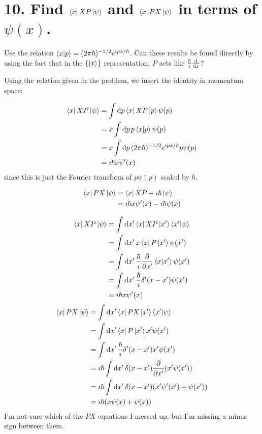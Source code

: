 \documentclass[a4paper,twoside]{article}
\begin{document}
\section*{10. Find $ \bra{x} XP \ket{\psi} $ and $ \bra{x} PX \ket{\psi} $ in terms of $ \psi(x) $.}
Use the relation $ \bra{x}\ket{p} = (2 \pi \hbar)^{-1/2} e^{\imath p x/ \hbar} $. Can these results be found directly by using the fact that in the $ \{\ket{x}\} $ representation, $ P $ acts like $ \frac{\hbar}{\imath} \dv{x} $?
\begin{problem}
    Using the relation given in the problem, we insert the identity in momentum space:

    \begin{align}
        \bra{x} XP \ket{\psi} &= \int \dd{p} \bra{x} XP \ket{p} \psi(p)\\
        &= x\int \dd{p} p \bra{x}\ket{p} \psi(p)\\
        &= x \int \dd{p} (2 \pi \hbar)^{-1/2} e^{\imath px/\hbar} p \psi(p)\\
        &= \imath\hbar x \psi'(x)
    \end{align}
    since this is just the Fourier transform of $ p \psi(p) $ scaled by $ \hbar $.

    \begin{align}
        \bra{x} PX \ket{\psi} &= \bra{x} XP - \imath\hbar\ket{\psi}\\
        &= \imath\hbar x\psi'(x) - \imath\hbar\psi(x)
    \end{align}
    
    \begin{align}
        \bra{x} XP \ket{\psi} &= \int \dd{x'} \bra{x} XP \ket{x'}\bra{x'}\ket{\psi}\\
        &= \int \dd{x'} x \bra{x} P \ket{x'} \psi(x')\\
        &= \int \dd{x'} \frac{\hbar}{\imath} \pdv{x'} \bra{x}\ket{x'} \psi(x')\\
        &= \int \dd{x'} \frac{\hbar}{\imath} \delta'(x-x') \psi(x')\\
        &= \imath\hbar x \psi'(x)
    \end{align}
    \begin{align}
        \bra{x} PX \ket{\psi} &= \int \dd{x'} \bra{x} PX \ket{x'} \bra{x'}\ket{\psi}\\
        &= \int \dd{x'} \bra{x} P \ket{x'} x' \psi(x')\\
        &= \int \dd{x'} \frac{\hbar}{\imath} \delta'(x-x') x' \psi(x')\\
        &= \imath\hbar \int \dd{x'} \delta(x-x') \pdv{x'}(x'\psi(x'))\\
        &= \imath\hbar \int \dd{x'} \delta(x-x') (x' \psi'(x') + \psi(x'))\\
        &= \imath\hbar (x\psi(x) + \psi(x))
    \end{align}
    I'm not sure which of the $ PX $ equations I messed up, but I'm missing a minus sign between them.
\end{problem}
\end{document}
